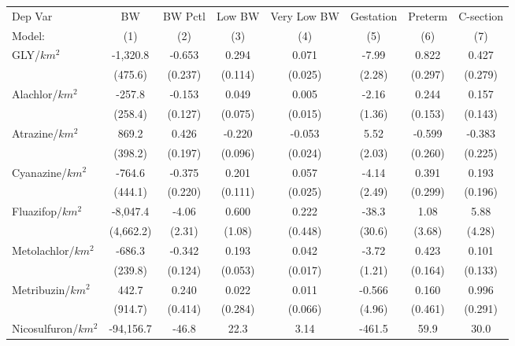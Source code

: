 \begingroup
\centering
\begin{tabular}{lccccccc}
   \toprule
   Dep Var                   & BW         & BW Pctl & Low BW  & Very Low BW & Gestation & Preterm & C-section\\  
   Model:                    & (1)        & (2)     & (3)     & (4)         & (5)       & (6)     & (7)\\  
   \midrule 
   GLY/$km^2$                & -1,320.8   & -0.653  & 0.294   & 0.071       & -7.99     & 0.822   & 0.427\\   
                             & (475.6)    & (0.237) & (0.114) & (0.025)     & (2.28)    & (0.297) & (0.279)\\   
   Alachlor/$km^2$           & -257.8     & -0.153  & 0.049   & 0.005       & -2.16     & 0.244   & 0.157\\   
                             & (258.4)    & (0.127) & (0.075) & (0.015)     & (1.36)    & (0.153) & (0.143)\\   
   Atrazine/$km^2$           & 869.2      & 0.426   & -0.220  & -0.053      & 5.52      & -0.599  & -0.383\\   
                             & (398.2)    & (0.197) & (0.096) & (0.024)     & (2.03)    & (0.260) & (0.225)\\   
   Cyanazine/$km^2$          & -764.6     & -0.375  & 0.201   & 0.057       & -4.14     & 0.391   & 0.193\\   
                             & (444.1)    & (0.220) & (0.111) & (0.025)     & (2.49)    & (0.299) & (0.196)\\   
   Fluazifop/$km^2$          & -8,047.4   & -4.06   & 0.600   & 0.222       & -38.3     & 1.08    & 5.88\\   
                             & (4,662.2)  & (2.31)  & (1.08)  & (0.448)     & (30.6)    & (3.68)  & (4.28)\\   
   Metolachlor/$km^2$        & -686.3     & -0.342  & 0.193   & 0.042       & -3.72     & 0.423   & 0.101\\   
                             & (239.8)    & (0.124) & (0.053) & (0.017)     & (1.21)    & (0.164) & (0.133)\\   
   Metribuzin/$km^2$         & 442.7      & 0.240   & 0.022   & 0.011       & -0.566    & 0.160   & 0.996\\   
                             & (914.7)    & (0.414) & (0.284) & (0.066)     & (4.96)    & (0.461) & (0.291)\\   
   Nicosulfuron/$km^2$       & -94,156.7  & -46.8   & 22.3    & 3.14        & -461.5    & 59.9    & 30.0\\   

\end{tabular}
